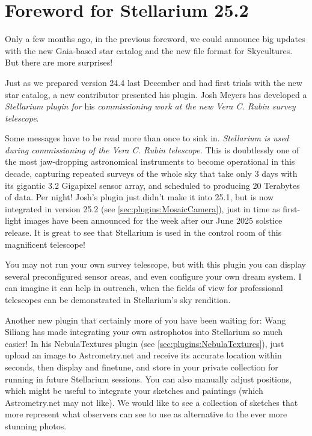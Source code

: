 
\chapter*{Foreword for Stellarium 25.2}
\label{ch:Foreword}

Only a few months ago, in the previous foreword, we could announce big updates with the 
new Gaia-based star catalog and the new file format for Skycultures. But there are more surprises!


Just as we prepared version 24.4 last December and had first trials with the new star catalog, a new contributor 
presented his plugin. Josh Meyers has developed a \emph{Stellarium plugin for} his \emph{commissioning work at the new
Vera C. Rubin survey telescope}. 

Some messages have to be read more than once to sink in. 
\emph{Stellarium is used during commissioning of the Vera C. Rubin telescope.}
This is doubtlessly one of the most jaw-dropping astronomical instruments to become 
operational in this decade, capturing repeated surveys of the whole sky that take only 3 days with its 
gigantic 3.2 Gigapixel sensor array, and scheduled to producing 20 Terabytes of data. Per night! 
Josh's plugin just didn't make it into 25.1, but is now integrated in version 25.2 (see \ref{sec:plugins:MosaicCamera}), 
just in time as first-light images have been announced for the week after our June 2025 solstice release.
It is great to see that Stellarium is used in the control room of this magnificent telescope!  

You may not run your own survey telescope, but with this plugin you can display several preconfigured sensor areas, 
and even configure your own dream system. I can imagine it can help in outreach, 
when the fields of view for professional telescopes can be demonstrated in Stellarium's sky rendition.


Another new plugin that certainly more of you have been waiting for: Wang Siliang has made 
integrating your own astrophotos into Stellarium so much easier! In his NebulaTextures plugin (see \ref{sec:plugins:NebulaTextures}), 
just upload an image to Astrometry.net and receive its accurate location within seconds, then display and finetune, 
and store in your private collection for running in future Stellarium sessions. You can also manually adjust positions, 
which might be useful to integrate your sketches and paintings (which Astrometry.net may not like). 
We would like to see a collection of sketches that more represent what observers can see to use as alternative 
to the ever more stunning photos.



